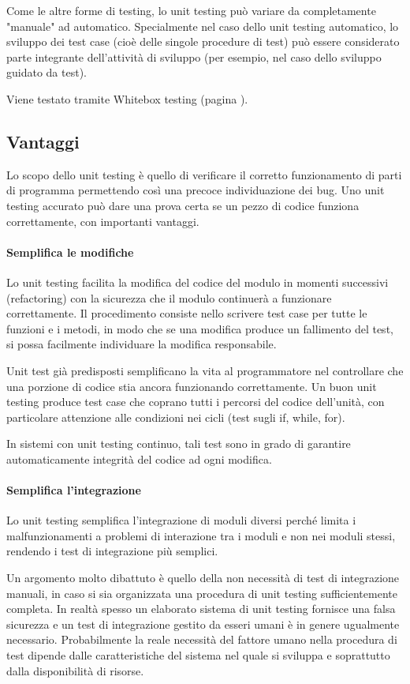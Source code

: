 \documentclass[11pt,a4paper]{book}
\begin{document}
Come le altre forme di testing, lo unit testing può variare da completamente "manuale" ad automatico. Specialmente nel caso dello unit testing automatico, lo sviluppo dei test case (cioè delle singole procedure di test) può essere considerato parte integrante dell'attività di sviluppo (per esempio, nel caso dello sviluppo guidato da test).

Viene testato tramite Whitebox testing (pagina \pageref{par: whitebox}).
\subsection{Vantaggi}
Lo scopo dello unit testing è quello di verificare il corretto funzionamento di parti di programma permettendo così una precoce individuazione dei bug. Uno unit testing accurato può dare una prova certa se un pezzo di codice funziona correttamente, con importanti vantaggi.

\paragraph{Semplifica le modifiche}
Lo unit testing facilita la modifica del codice del modulo in momenti successivi (refactoring) con la sicurezza che il modulo continuerà a funzionare correttamente. Il procedimento consiste nello scrivere test case per tutte le funzioni e i metodi, in modo che se una modifica produce un fallimento del test, si possa facilmente individuare la modifica responsabile.

Unit test già predisposti semplificano la vita al programmatore nel controllare che una porzione di codice stia ancora funzionando correttamente. Un buon unit testing produce test case che coprano tutti i percorsi del codice dell'unità, con particolare attenzione alle condizioni nei cicli (test sugli if, while, for).

In sistemi con unit testing continuo, tali test sono in grado di garantire automaticamente integrità del codice ad ogni modifica.

\paragraph{Semplifica l'integrazione}
Lo unit testing semplifica l'integrazione di moduli diversi perché limita i malfunzionamenti a problemi di interazione tra i moduli e non nei moduli stessi, rendendo i test di integrazione più semplici.

Un argomento molto dibattuto è quello della non necessità di test di integrazione manuali, in caso si sia organizzata una procedura di unit testing sufficientemente completa. In realtà spesso un elaborato sistema di unit testing fornisce una falsa sicurezza e un test di integrazione gestito da esseri umani è in genere ugualmente necessario. Probabilmente la reale necessità del fattore umano nella procedura di test dipende dalle caratteristiche del sistema nel quale si sviluppa e soprattutto dalla disponibilità di risorse.
\end{document}
